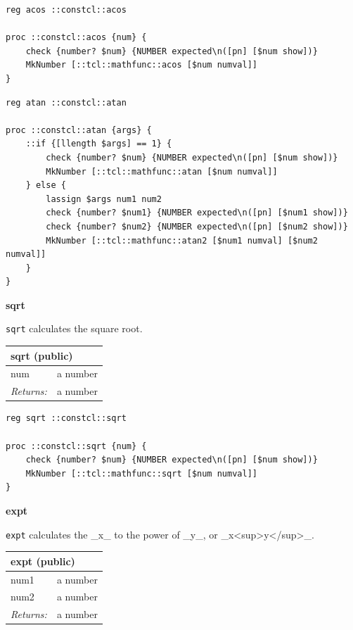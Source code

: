 \documentclass[twoside,9pt]{report}
\begin{document}
\noindent\makebox[\linewidth]{\rule{\linewidth}{0.4pt}}
\noindent\makebox[\linewidth]{\rule{\linewidth}{0.4pt}}
\begin{lstlisting}
reg acos ::constcl::acos
 
proc ::constcl::acos {num} {
    check {number? $num} {NUMBER expected\n([pn] [$num show])}
    MkNumber [::tcl::mathfunc::acos [$num numval]]
}
\end{lstlisting}
\noindent\makebox[\linewidth]{\rule{\linewidth}{0.4pt}}
\noindent\makebox[\linewidth]{\rule{\linewidth}{0.4pt}}
\begin{lstlisting}
reg atan ::constcl::atan
 
proc ::constcl::atan {args} {
    ::if {[llength $args] == 1} {
        check {number? $num} {NUMBER expected\n([pn] [$num show])}
        MkNumber [::tcl::mathfunc::atan [$num numval]]
    } else {
        lassign $args num1 num2
        check {number? $num1} {NUMBER expected\n([pn] [$num1 show])}
        check {number? $num2} {NUMBER expected\n([pn] [$num2 show])}
        MkNumber [::tcl::mathfunc::atan2 [$num1 numval] [$num2 numval]]
    }
}
\end{lstlisting}
\noindent\makebox[\linewidth]{\rule{\linewidth}{0.4pt}}

\textbf{sqrt}


\texttt{sqrt} calculates the square root.

\begin{tabular}{ |l l| }
\hline
\multicolumn{2}{|l|}{sqrt (public)} \\
\hline
num & a number \\
\textit{Returns:} & a number \\
\hline
\end{tabular}

\noindent\makebox[\linewidth]{\rule{\linewidth}{0.4pt}}
\begin{lstlisting}
reg sqrt ::constcl::sqrt
 
proc ::constcl::sqrt {num} {
    check {number? $num} {NUMBER expected\n([pn] [$num show])}
    MkNumber [::tcl::mathfunc::sqrt [$num numval]]
}
\end{lstlisting}
\noindent\makebox[\linewidth]{\rule{\linewidth}{0.4pt}}

\textbf{expt}


\texttt{expt} calculates the \_x\_ to the power of \_y\_, or \_x<sup>y</sup>\_.

\begin{tabular}{ |l l| }
\hline
\multicolumn{2}{|l|}{expt (public)} \\
\hline
num1 & a number \\
num2 & a number \\
\textit{Returns:} & a number \\
\hline
\end{tabular}
\end{document}
